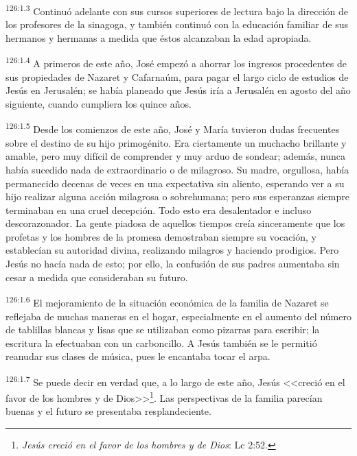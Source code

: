 \par 
\textsuperscript{126:1.3} Continuó adelante con sus cursos superiores de lectura bajo la dirección de los profesores de la sinagoga, y también continuó con la educación familiar de sus hermanos y hermanas a medida que éstos alcanzaban la edad apropiada.

\par 
\textsuperscript{126:1.4} A primeros de este año, José empezó a ahorrar los ingresos procedentes de sus propiedades de Nazaret y Cafarnaúm, para pagar el largo ciclo de estudios de Jesús en Jerusalén; se había planeado que Jesús iría a Jerusalén en agosto del año siguiente, cuando cumpliera los quince años.

\par 
\textsuperscript{126:1.5} Desde los comienzos de este año, José y María tuvieron dudas frecuentes sobre el destino de su hijo primogénito. Era ciertamente un muchacho brillante y amable, pero muy difícil de comprender y muy arduo de sondear; además, nunca había sucedido nada de extraordinario o de milagroso. Su madre, orgullosa, había permanecido decenas de veces en una expectativa sin aliento, esperando ver a su hijo realizar alguna acción milagrosa o sobrehumana; pero sus esperanzas siempre terminaban en una cruel decepción. Todo esto era desalentador e incluso descorazonador. La gente piadosa de aquellos tiempos creía sinceramente que los profetas y los hombres de la promesa demostraban siempre su vocación, y establecían su autoridad divina, realizando milagros y haciendo prodigios. Pero Jesús no hacía nada de esto; por ello, la confusión de sus padres aumentaba sin cesar a medida que consideraban su futuro.

\par 
\textsuperscript{126:1.6} El mejoramiento de la situación económica de la familia de Nazaret se reflejaba de muchas maneras en el hogar, especialmente en el aumento del número de tablillas blancas y lisas que se utilizaban como pizarras para escribir; la escritura la efectuaban con un carboncillo. A Jesús también se le permitió reanudar sus clases de música, pues le encantaba tocar el arpa.

\par 
\textsuperscript{126:1.7} Se puede decir en verdad que, a lo largo de este año, Jesús <<creció en el favor de los hombres y de Dios>>\footnote{\textit{Jesús creció en el favor de los hombres y de Dios}: Lc 2:52.}. Las perspectivas de la familia parecían buenas y el futuro se presentaba resplandeciente.

